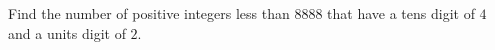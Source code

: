 Find the number of positive integers less than $8888$ that have a tens digit of $4$ and a units digit of $2$.
